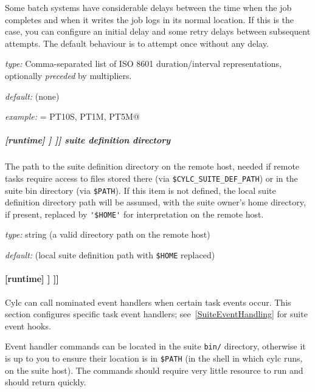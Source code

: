 Some batch systems have considerable delays between the time when the job
completes and when it writes the job logs in its normal location. If this is
the case, you can configure an initial delay and some retry delays between
subsequent attempts. The default behaviour is to attempt once without any
delay.

\begin{myitemize}
    \item {\em type:} Comma-separated list of ISO 8601 duration/interval representations, optionally {\em preceded} by multipliers.
    \item {\em default:} (none)
    \item {\em example:} \lstinline@handler = PT10S, PT1M, PT5M@
\end{myitemize}

\subparagraph[suite definition directory]{[runtime] \textrightarrow [[\_\_NAME\_\_]] \textrightarrow [[[remote]]] \textrightarrow  suite definition directory}

The path to the suite definition directory on the remote host, needed if
remote tasks require access to files stored there (via
\lstinline=$CYLC_SUITE_DEF_PATH=) or in the suite bin directory (via
\lstinline=$PATH=).  If this item is not defined, the local suite
definition directory path will be assumed, with the suite owner's home
directory, if present, replaced by \lstinline='$HOME'= for
interpretation on the remote host.

\begin{myitemize}
\item {\em type:} string (a valid directory path on the remote host)
\item {\em default:} (local suite definition path with \lstinline=$HOME=
    replaced)
\end{myitemize}


\paragraph[{[[[}events{]]]}]{[runtime] \textrightarrow [[\_\_NAME\_\_]] \textrightarrow [[[events]]]}
\label{TaskEventHandling}

Cylc can call nominated event handlers when certain task events occur. This
section configures specific task event handlers; see~\ref{SuiteEventHandling} for
suite event hooks.

Event handler commands can be located in the suite \lstinline=bin/= directory,
otherwise it is up to you to ensure their location is in \lstinline=$PATH= (in
the shell in which cylc runs, on the suite host). The commands should require
very little resource to run and should return quickly.

